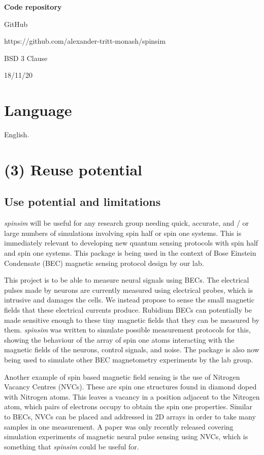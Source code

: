 \documentclass{jors}
\begin{document}
{\bf Code repository}

\begin{description}[noitemsep,topsep=0pt]
	\item[Name:] GitHub
	\item[Persistent identifier:] https://github.com/alexander-tritt-monash/spinsim
	\item[Licence:] BSD 3 Clause
	\item[Date published:] 18/11/20
\end{description}

\section{Language}

English.

\section{(3) Reuse potential}

	\subsection{Use potential and limitations}
		\emph{spinsim} will be useful for any research group needing quick, accurate, and / or large numbers of simulations involving spin half or spin one systems.
		This is immediately relevant to developing new quantum sensing protocols with spin half and spin one systems.
		This package is being used in the context of Bose Einstein Condensate (BEC) magnetic sensing protocol design by our lab.

		This project is to be able to measure neural signals using BECs.
		The electrical pulses made by neurons are currently measured using electrical probes, which is intrusive and damages the cells.
		We instead propose to sense the small magnetic fields that these electrical currents produce.
		Rubidium BECs can potentially be made sensitive enough to these tiny magnetic fields that they can be measured by them.
		\emph{spinsim} was written to simulate possible measurement protocols for this, showing the behaviour of the array of spin one atoms interacting with the magnetic fields of the neurons, control signals, and noise.
		The package is also now being used to simulate other BEC magnetometry experiments by the lab group.

		Another example of spin based magnetic field sensing is the use of Nitrogen Vacancy Centres (NVCs).
		These are spin one structures found in diamond doped with Nitrogen atoms.
		This leaves a vacancy in a position adjacent to the Nitrogen atom, which pairs of electrons occupy to obtain the spin one properties.
		Similar to BECs, NVCs can be placed and addressed in 2D arrays in order to take many samples in one measurement.
		A paper was only recently released covering simulation experiments of magnetic neural pulse sensing using NVCs\cite{parashar_axon_2020}, which is something that \emph{spinsim} could be useful for.
\end{document}
